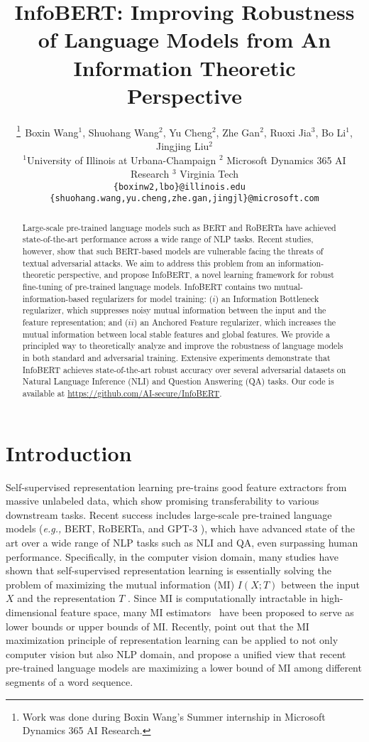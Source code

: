 \documentclass{article} \usepackage{iclr2021_conference,times}
\title{InfoBERT: Improving Robustness of Language Models from An Information Theoretic \\ Perspective}
\author{\thanks{Work was done during Boxin Wang's Summer internship in Microsoft Dynamics 365 AI Research.}$\;\,$Boxin Wang$^1$, Shuohang Wang$^2$, Yu Cheng$^2$, Zhe Gan$^2$, Ruoxi Jia$^3$, Bo Li$^1$, Jingjing Liu$^2$ \\
\small $^1$University of Illinois at Urbana-Champaign \; $^2$ Microsoft Dynamics 365 AI Research \; $^3$ Virginia Tech \\
\scriptsize \texttt{\{boxinw2,lbo\}@illinois.edu \, \{shuohang.wang,yu.cheng,zhe.gan,jingjl\}@microsoft.com}}
\theoremstyle{definition}
\theoremstyle{remark}
\begin{document}
\maketitle

\begin{abstract}
Large-scale pre-trained language models such as BERT and RoBERTa have achieved state-of-the-art performance across a wide range of NLP tasks. Recent studies, however, show that such BERT-based models are vulnerable facing the threats of textual adversarial attacks. We aim to address this problem from an information-theoretic perspective, and propose InfoBERT, a novel learning framework for robust fine-tuning of pre-trained language models. InfoBERT contains two mutual-information-based regularizers for model training: ($i$) an Information Bottleneck regularizer, which suppresses noisy mutual information between the input and the feature representation; and ($ii$) an Anchored Feature regularizer, which increases the mutual information between local stable features and global features.
We provide a principled way to theoretically analyze and improve the robustness of language models in both standard and adversarial training. Extensive experiments demonstrate that InfoBERT 
achieves state-of-the-art robust accuracy over several adversarial datasets on Natural Language Inference (NLI) and Question Answering (QA) tasks. 
Our code is available at \url{https://github.com/AI-secure/InfoBERT}.
    
\end{abstract} 
\section{Introduction}


Self-supervised representation learning pre-trains good feature extractors from massive unlabeled data, which show promising transferability to various downstream tasks.
Recent success includes large-scale pre-trained language models (\emph{e.g.,} BERT, RoBERTa, and GPT-3 \citep{bert,roberta,gpt3}), which have advanced state of the art over a wide range of NLP tasks such as NLI and QA, even surpassing human performance. Specifically, in the computer vision domain, many studies have shown that self-supervised representation learning is essentially solving the problem of maximizing the mutual information (MI) $I(X;T)$ between the input $X$ and the representation $T$ \citep{infonce, pmlr-v80-belghazi18a,hjelm2018learning,simclr}. Since MI is computationally intractable in high-dimensional feature space, many MI estimators~\citep{pmlr-v80-belghazi18a} have been proposed to serve as lower bounds \citep{Barber2003TheIA,infonce} or upper bounds \citep{Cheng2020CLUBAC} of MI.  Recently, \citeauthor{Kong2020A} 
point out that the MI maximization principle of representation learning can be applied to not only computer vision but also NLP domain, and propose a unified view that recent pre-trained language models are maximizing a lower bound of MI among different segments of a word sequence. 
\end{document}
